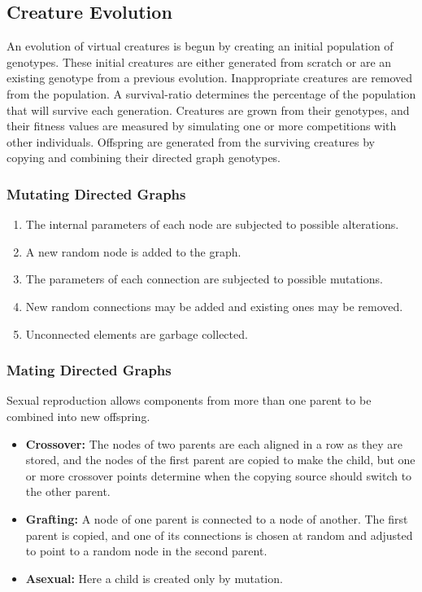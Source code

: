 \documentclass[../main.tex]{subfiles}
\begin{document}
\subsection{Creature Evolution}

An evolution of virtual creatures is begun by creating an initial population of genotypes. These initial creatures are
either generated from scratch or are an existing genotype from a previous evolution.  Inappropriate creatures are
removed from the population. A survival-ratio determines the percentage of the population that will survive each
generation. Creatures are grown from their genotypes, and their fitness values are measured by simulating one or more
competitions with other individuals. Offspring are generated from the surviving creatures by copying and combining
their directed graph genotypes.

\subsubsection{Mutating Directed Graphs}

\begin{enumerate}
	\item The internal parameters of each node are subjected to possible alterations.
	\item A new random node is added to the graph.
	\item The parameters of each connection are subjected to possible mutations.
	\item New random connections may be added and existing ones may be removed.
	\item Unconnected elements are garbage collected.
\end{enumerate}

\subsubsection{Mating Directed Graphs}

Sexual reproduction allows components from more than one parent to be combined into new offspring.

\begin{itemize}
	\item \textbf{Crossover:} The nodes of two parents are each aligned in a row as they are stored, and the nodes of the first parent are copied to make the child, but one or more crossover points determine when the copying source should switch to the other parent.
	\item \textbf{Grafting:} A node of one parent is connected to a node of another.  The first parent is copied, and one of its connections is chosen at random and adjusted to point to a random node in the second parent.
	\item \textbf{Asexual:} Here a child is created only by mutation.
\end{itemize}
\end{document}
